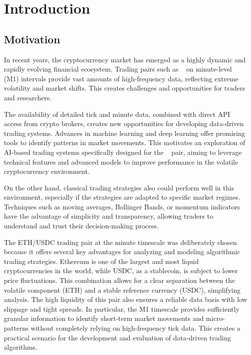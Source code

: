 \section{Introduction}

\subsection{Motivation}

In recent years, the cryptocurrency market has emerged as a highly dynamic and rapidly evolving financial ecosystem.
Trading pairs such as \ethusdc~ on minute-level (M1) intervals provide vast amounts of high-frequency data, reflecting extreme volatility and market shifts.
This creates challenges and opportunities for traders and researchers.

The availability of detailed tick and minute data, combined with direct API access from crypto brokers, creates new opportunities for developing data-driven trading systems.
Advances in machine learning and deep learning offer promising tools to identify patterns in market movements.
This motivates an exploration of AI-based trading systems specifically designed for the \ethusdc~ pair, aiming to leverage technical features and advanced models to improve performance in the volatile cryptocurrency environment.

On the other hand, classical trading strategies also could perform well in this environment, especially if the strategies are adapted to specific market regimes.
Techniques such as moving averages, Bollinger Bands, or momentum indicators have the advantage of simplicity and transparency, allowing traders to understand and trust their decision-making process.

The ETH/USDC trading pair at the minute timescale was deliberately chosen because it offers several key advantages for analyzing and modeling algorithmic trading strategies.
Ethereum is one of the largest and most liquid cryptocurrencies in the world, while USDC, as a stablecoin, is subject to lower price fluctuations.
This combination allows for a clear separation between the volatile component (ETH) and a stable reference currency (USDC), simplifying analysis.
The high liquidity of this pair also ensures a reliable data basis with low slippage and tight spreads.
In particular, the M1 timescale provides sufficiently granular information to identify short-term market movements and micro-patterns without completely relying on high-frequency tick data.
This creates a practical scenario for the development and evaluation of data-driven trading algorithms.


